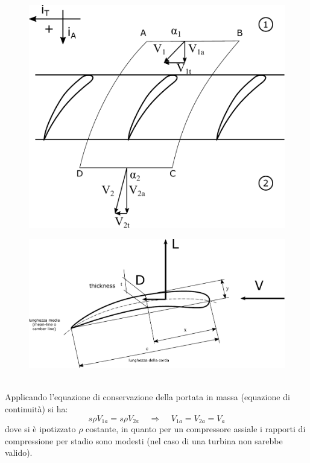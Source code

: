 \begin{figure}
\centering
\begin{minipage}{.4\textwidth}
  \centering
  \includegraphics[width=.95\linewidth]{fig/schiera1.pdf}
  \label{fig:schiera1}
\end{minipage}%
\begin{minipage}{.6\textwidth}
  \centering
  \includegraphics[width=.85\linewidth]{fig/LDref.pdf}
  \label{fig:LDref}
\end{minipage}
\end{figure}
\\Applicando l'equazione di conservazione della portata in massa (equazione di continuità) si ha:
\begin{equation}
s \rho V_{1a} = s \rho V_{2a} \;\;\;\; \Rightarrow \;\;\;\; V_{1a} = V_{2a} = V_a
\end{equation}
dove si è ipotizzato $\rho$ costante, in quanto per un compressore assiale i rapporti di compressione per stadio sono modesti (nel caso di una turbina non sarebbe valido).\\
